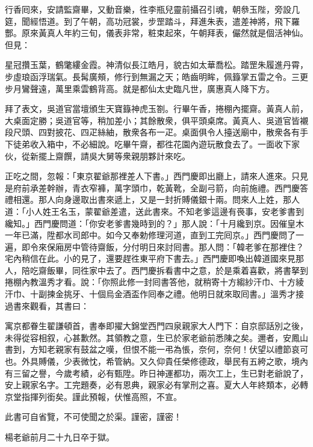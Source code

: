 行香囘來，安請監齋畢，又動音樂，徃李瓶兒靈前攝召引魂，朝叅玉陛，旁設几筵，聞經悟道。到了午朝，高功冠裳，步罡踏斗，拜進朱表，遣差神將，飛下羅酆。原來黃真人年約三旬，儀表非常，粧束起來，午朝拜表，儼然就是個活神仙。但見：

\begin{myquote} 
星冠攢玉葉，鶴氅縷金霞。神清似長江皓月，貌古如太華喬松。踏罡朱履進丹霄，步虛琅函浮瑞氣。長髯廣頰，修行到無漏之天；皓齒明眸，佩籙掌五雷之令。三更步月鸞聲遠，萬里乘雲鶴背高。就是都仙太史臨凡世，廣惠真人降下方。
\end{myquote} 

拜了表文，吳道官當壇頒生天寶籙神虎玉劄。行畢午香，捲棚內擺齋。黃真人前，大桌面定勝；吳道官等，稍加差小；其餘散衆，俱平頭桌席。黃真人、吳道官皆襯段尺頭、四對披花、四疋絲紬，散衆各布一疋。桌面俱令人擡送廟中，散衆各有手下徒弟收入箱中，不必細說。吃畢午齋，都徃花園內遊玩散食去了。一面收下家伙，從新擺上齋饌，請吳大舅等衆親朋夥計來吃。

正吃之間，忽報：「東京翟爺那裡差人下書。」西門慶即出廳上，請來人進來。只見是府前承差幹辦，青衣窄褲，萬字頭巾，乾黃靴，全副弓箭，向前施禮。西門慶答禮相還。那人向身邊取出書來遞上，又是一封折賻儀銀十兩。問來人上姓，那人道：「小人姓王名玉，蒙翟爺差遣，送此書來。不知老爹這邊有䘮事，安老爹書到纔知。」西門慶問道：「你安老爹書幾時到的？」那人說：「十月纔到京。因催皇木一年已滿，陞都水司郎中。如今又奉勅修理河道，直到工完囘京。」西門慶問了一遍，即令來保廂房中管待齋飯，分付明日來討囘書。那人問：「韓老爹在那裡住？宅內稍信在此。小的見了，還要趕徃東平府下書去。」西門慶即喚出韓道國來見那人，陪吃齋飯畢，同徃家中去了。西門慶拆看書中之意，於是乘着喜歡，將書拏到捲棚內教溫秀才看。{}說：「你照此修一封囘書答他，就稍寄十方縐紗汗巾、十方綾汗巾、十副揀金挑牙、十個烏金酒盃作囘奉之禮。他明日就來取囘書。」溫秀才接過書來觀看，其書曰：

\begin{myquote}[\markfont]
寓京都眷生翟謙頓首，書奉即擢大錦堂西門四泉親家大人門下：自京邸話別之後，未得從容相叙，心甚歉然。其領教之意，生已於家老爺前悉陳之矣。邇者，安鳳山書到，方知老親家有鼓盆之嘆，但恨不能一弔為悵，奈何，奈何！伏望以禮節哀可也。外具賻儀，少表微忱，希管納。又久仰貴任榮修德政，舉民有五絝之歌，境內有三留之譽，今歲考績，必有甄陞。昨日神運都功，兩次工上，生已對老爺說了，安上親家名字。工完題奏，必有恩典，親家必有掌刑之喜。夏大人年終類本，必轉京堂指揮列銜矣。謹此預報，伏惟高照，不宣。

{}此書可自省覽，不可使聞之於渠。謹密，謹密！

{}

楊老爺前月二十九日卒于獄。{}

\end{myquote}


